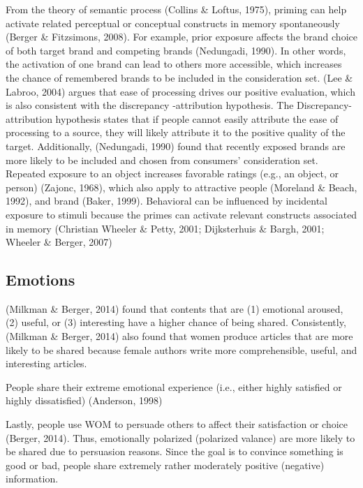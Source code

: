 \documentclass[
]{book}
\begin{document}
From the theory of semantic process (Collins \& Loftus, 1975), priming can help activate related perceptual or conceptual constructs in memory spontaneously (Berger \& Fitzsimons, 2008). For example, prior exposure affects the brand choice of both target brand and competing brands (Nedungadi, 1990). In other words, the activation of one brand can lead to others more accessible, which increases the chance of remembered brands to be included in the consideration set. (Lee \& Labroo, 2004) argues that ease of processing drives our positive evaluation, which is also consistent with the discrepancy -attribution hypothesis. The Discrepancy-attribution hypothesis states that if people cannot easily attribute the ease of processing to a source, they will likely attribute it to the positive quality of the target. Additionally, (Nedungadi, 1990) found that recently exposed brands are more likely to be included and chosen from consumers' consideration set. Repeated exposure to an object increases favorable ratings (e.g., an object, or person) (Zajonc, 1968), which also apply to attractive people (Moreland \& Beach, 1992), and brand (Baker, 1999). Behavioral can be influenced by incidental exposure to stimuli because the primes can activate relevant constructs associated in memory (Christian Wheeler \& Petty, 2001; Dijksterhuis \& Bargh, 2001; Wheeler \& Berger, 2007)

\hypertarget{emotions}{%
\subsection{Emotions}\label{emotions}}

(Milkman \& Berger, 2014) found that contents that are (1) emotional aroused, (2) useful, or (3) interesting have a higher chance of being shared. Consistently, (Milkman \& Berger, 2014) also found that women produce articles that are more likely to be shared because female authors write more comprehensible, useful, and interesting articles.

People share their extreme emotional experience (i.e., either highly satisfied or highly dissatisfied) (Anderson, 1998)

Lastly, people use WOM to persuade others to affect their satisfaction or choice (Berger, 2014). Thus, emotionally polarized (polarized valance) are more likely to be shared due to persuasion reasons. Since the goal is to convince something is good or bad, people share extremely rather moderately positive (negative) information.
\end{document}
